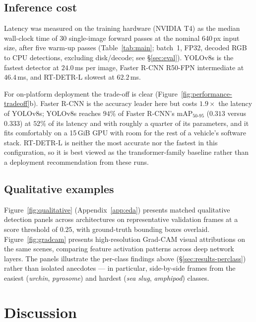 \documentclass[11pt,a4paper,twocolumn]{article}
\begin{document}
\subsection{Inference cost}
\label{sec:results-latency}

Latency was measured on the training hardware (NVIDIA T4) as the median wall-clock time of 30 single-image forward passes at the nominal 640\,px input size, after five warm-up passes (Table~\ref{tab:main}; batch~1, FP32, decoded RGB to CPU detections, excluding disk/decode; see \S\ref{sec:eval}). YOLOv8s is the fastest detector at $24.0$\,ms per image, Faster R-CNN R50-FPN intermediate at $46.4$\,ms, and RT-DETR-L slowest at $62.2$\,ms.

For on-platform deployment the trade-off is clear (Figure~\ref{fig:performance-tradeoff}b). Faster R-CNN is the accuracy leader here but costs $1.9\times$ the latency of YOLOv8s; YOLOv8s reaches $94\%$ of Faster R-CNN's mAP$_{50\text{-}95}$ ($0.313$ versus $0.333$) at $52\%$ of its latency and with roughly a quarter of its parameters, and it fits comfortably on a 15\,GiB GPU with room for the rest of a vehicle's software stack. RT-DETR-L is neither the most accurate nor the fastest in this configuration, so it is best viewed as the transformer-family baseline rather than a deployment recommendation from these runs.

\subsection{Qualitative examples}
\label{sec:results-qualitative}

Figure~\ref{fig:qualitative} (Appendix~\ref{app:eda}) presents matched qualitative detection panels across architectures on representative validation frames at a score threshold of $0.25$, with ground-truth bounding boxes overlaid. Figure~\ref{fig:gradcam} presents high-resolution Grad-CAM visual attributions on the same scenes, comparing feature activation patterns across deep network layers. The panels illustrate the per-class findings above (\S\ref{sec:results-perclass}) rather than isolated anecdotes --- in particular, side-by-side frames from the easiest (\textit{urchin}, \textit{pyrosome}) and hardest (\textit{sea slug}, \textit{amphipod}) classes.

\section{Discussion}
\label{sec:discussion}
\end{document}
